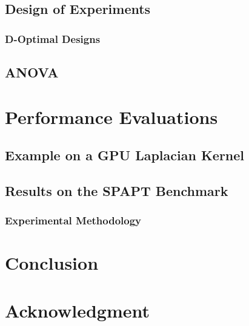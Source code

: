 \documentclass[conference]{IEEEtran}
\begin{document}
\subsection{Design of Experiments}
\label{sec:org7dc452a}
\subsubsection{D-Optimal Designs}
\label{sec:orgf688b2f}
\subsection{ANOVA}
\label{sec:org8e0171b}
\section{Performance Evaluations}
\label{sec:orgca2410a}
\subsection{Example on a GPU Laplacian Kernel}
\label{sec:orgeecf20e}
\subsection{Results on the SPAPT Benchmark}
\label{sec:org8ce887d}
\subsubsection{Experimental Methodology}
\label{sec:org470008f}
\section{Conclusion}
\label{sec:orgfc5fc86}
\section*{Acknowledgment}
\label{sec:org1ad2888}


\end{document}
